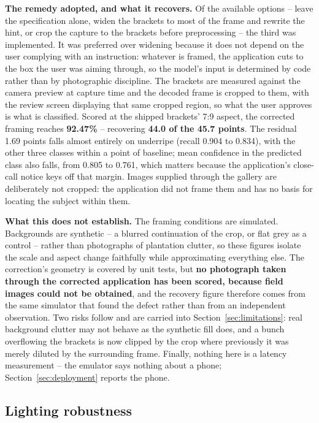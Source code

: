 \documentclass{article}
\begin{document}
\textbf{The remedy adopted, and what it recovers.} Of the available options -- leave the specification
alone, widen the brackets to most of the frame and rewrite the hint, or crop the capture to the brackets
before preprocessing -- the third was implemented. It was preferred over widening because it does not
depend on the user complying with an instruction: whatever is framed, the application cuts to the box the
user was aiming through, so the model's input is determined by code rather than by photographic
discipline. The brackets are measured against the camera preview at capture time and the decoded frame is
cropped to them, with the review screen displaying that same cropped region, so what the user approves is
what is classified. Scored at the shipped brackets' 7:9 aspect, the corrected framing reaches
\textbf{92.47\%} -- recovering \textbf{44.0 of the 45.7 points}. The residual 1.69 points falls almost
entirely on underripe (recall 0.904 to 0.834), with the other three classes within a point of baseline;
mean confidence in the predicted class also falls, from 0.805 to 0.761, which matters because the
application's close-call notice keys off that margin. Images supplied through the gallery are deliberately
not cropped: the application did not frame them and has no basis for locating the subject within them.

\textbf{What this does not establish.} The framing conditions are simulated. Backgrounds are synthetic --
a blurred continuation of the crop, or flat grey as a control -- rather than photographs of plantation
clutter, so these figures isolate the scale and aspect change faithfully while approximating everything
else. The correction's geometry is covered by unit tests, but \textbf{no photograph taken through the
corrected application has been scored, because field images could not be obtained}, and the recovery
figure therefore comes from the same simulator that found the defect rather than from an independent
observation. Two risks follow and are carried into Section~\ref{sec:limitations}: real background clutter
may not behave as the synthetic fill does, and a bunch overflowing the brackets is now clipped by the crop
where previously it was merely diluted by the surrounding frame. Finally, nothing here is a latency
measurement -- the emulator says nothing about a phone; Section~\ref{sec:deployment} reports the phone.

\subsection{Lighting robustness}
\label{sec:lightingresults}
\end{document}
